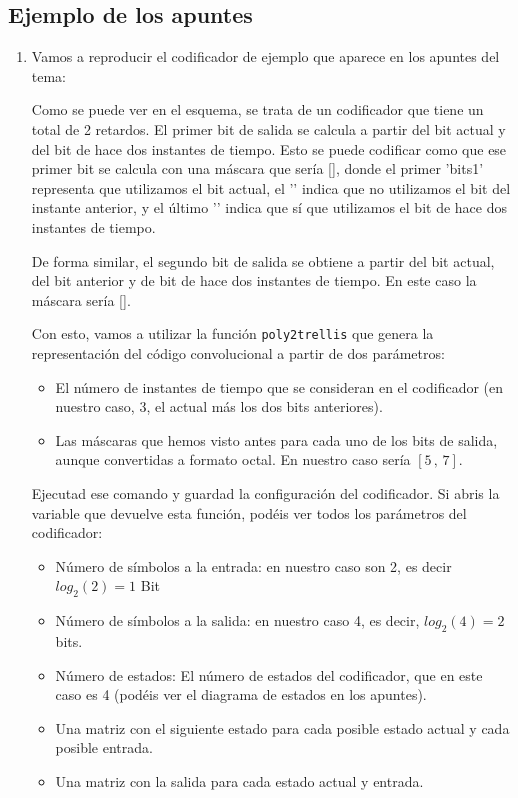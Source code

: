 \documentclass[es,practica]{uah}
\begin{document}
\subsection{Ejemplo de los apuntes}
	\begin{enumerate}
	
		\item Vamos a reproducir el codificador de ejemplo que aparece en los apuntes del tema:

		Como se puede ver en el esquema, se trata de un codificador que tiene un total de 2 retardos. El primer bit de salida se calcula a partir del bit actual y del bit de hace dos instantes de tiempo. Esto se puede codificar como que ese primer bit se calcula con una máscara que sería [], donde el primer 'bits{1}' representa que utilizamos el bit actual, el '' indica que no utilizamos el bit del instante anterior, y el último '' indica que sí que utilizamos el bit de hace dos instantes de tiempo. 

		De forma similar, el segundo bit de salida se obtiene a partir del bit actual, del bit anterior y de bit de hace dos instantes de tiempo. En este caso la máscara sería []. 

		Con esto, vamos a utilizar la función \texttt{poly2trellis} que genera la representación del código convolucional a partir de dos parámetros:

		\begin{itemize}
				\item El número de instantes de tiempo que se consideran en el codificador (en nuestro caso, 3, el actual más los dos bits anteriores).
				\item Las máscaras que hemos visto antes para cada uno de los bits de salida, aunque convertidas a formato octal. En nuestro caso sería $[5 \, ,\, 7]$.
		\end{itemize}

		Ejecutad ese comando y guardad la configuración del codificador. Si abris la variable que devuelve esta función, podéis ver todos los parámetros del codificador: 
		\begin{itemize}
			\item Número de símbolos a la entrada: en nuestro caso son 2, es decir $log_2(2) = 1$ Bit
			\item Número de símbolos a la salida: en nuestro caso 4, es decir, $log_2(4) = 2$ bits. 
			\item Número de estados: El número de estados del codificador, que en este caso es 4 (podéis ver el diagrama de estados en los apuntes).
			\item Una matriz con el siguiente estado para cada posible estado actual y cada posible entrada.
			\item Una matriz con la salida para cada estado actual y entrada. 
		\end{itemize}
		

\end{enumerate}
\end{document}

